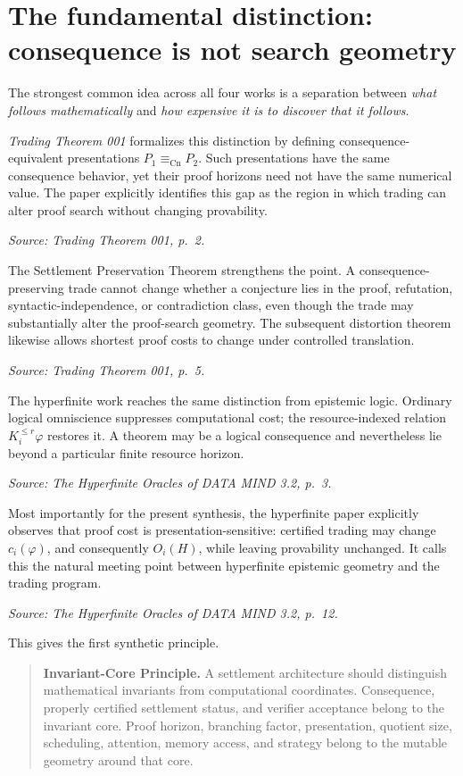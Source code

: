 \documentclass[11pt]{article}
\newcommand{\src}[1]{\par\smallskip\noindent\textit{Source: #1}\normalsize}
\newcommand{\Cn}{\mathrm{Cn}}
\begin{document}
\tableofcontents
\newpage

\section{The fundamental distinction: consequence is not search geometry}

The strongest common idea across all four works is a separation between \emph{what follows mathematically} and \emph{how expensive it is to discover that it follows}.

\emph{Trading Theorem 001} formalizes this distinction by defining consequence-equivalent presentations $P_1\equiv_{\Cn}P_2$. Such presentations have the same consequence behavior, yet their proof horizons need not have the same numerical value. The paper explicitly identifies this gap as the region in which trading can alter proof search without changing provability.
\src{\emph{Trading Theorem 001}, p.~2.}

The Settlement Preservation Theorem strengthens the point. A consequence-preserving trade cannot change whether a conjecture lies in the proof, refutation, syntactic-independence, or contradiction class, even though the trade may substantially alter the proof-search geometry. The subsequent distortion theorem likewise allows shortest proof costs to change under controlled translation.
\src{\emph{Trading Theorem 001}, p.~5.}

The hyperfinite work reaches the same distinction from epistemic logic. Ordinary logical omniscience suppresses computational cost; the resource-indexed relation $K_i^{\le r}\varphi$ restores it. A theorem may be a logical consequence and nevertheless lie beyond a particular finite resource horizon.
\src{\emph{The Hyperfinite Oracles of DATA MIND 3.2}, p.~3.}

Most importantly for the present synthesis, the hyperfinite paper explicitly observes that proof cost is presentation-sensitive: certified trading may change $c_i(\varphi)$, and consequently $O_i(H)$, while leaving provability unchanged. It calls this the natural meeting point between hyperfinite epistemic geometry and the trading program.
\src{\emph{The Hyperfinite Oracles of DATA MIND 3.2}, p.~12.}

This gives the first synthetic principle.

\begin{quote}
\textbf{Invariant-Core Principle.} A settlement architecture should distinguish mathematical invariants from computational coordinates. Consequence, properly certified settlement status, and verifier acceptance belong to the invariant core. Proof horizon, branching factor, presentation, quotient size, scheduling, attention, memory access, and strategy belong to the mutable geometry around that core.
\end{quote}
\end{document}
